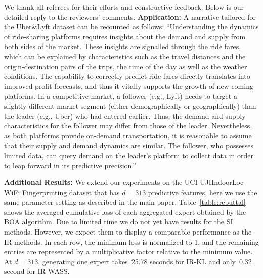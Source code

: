 \documentclass{article}
\begin{document}
\onecolumn

We thank all referees for their efforts and constructive feedback. Below is our detailed reply to the reviewers' comments.
{\bf Application:} A narrative tailored for the Uber\&Lyft dataset can be recounted as follows: 
``Understanding the dynamics of ride-sharing platforms requires insights about the demand and supply from both sides of the market. These insights are signalled through the ride fares, which can be explained by characteristics such as the travel distances and the origin-destination pairs of the trips, the time of the day as well as the weather conditions. The capability to correctly predict ride fares directly translates into improved profit forecasts, and thus it vitally supports the growth of new-coming platforms. In a competitive market, a follower (e.g., Lyft) needs to target a slightly different market segment (either demographically or geographically) than the leader (e.g., Uber) who had entered earlier. Thus, the demand and supply characteristics for the follower may differ from those of the leader. Nevertheless, as both platforms provide on-demand transportation, it is reasonable to assume that their supply and demand dynamics are similar. The follower, who possesses limited data, can query demand on the leader's platform to collect data in order to leap forward in its predictive precision.''
\vspace{-.1cm}

\textbf{Additional Results:} We extend our experiments on the UCI UJIIndoorLoc WiFi Fingerprinting dataset that has $d=313$ predictive features, here we use the same parameter setting as described in the main paper. Table~\ref{table:rebuttal} shows the averaged cumulative loss of each aggregated expert obtained by the BOA algorithm. Due to limited time we do not yet have results for the SI methods. However, we expect them to display a comparable performance as the IR methods. In each row, the minimum loss is normalized to 1, and the remaining entries are represented by a multiplicative factor relative to the minimum value. At $d \!=\! 313$, generating one expert takes~25.78 seconds for IR-KL and only~0.32 second for IR-WASS.  
\vspace{-.1cm}
\end{document}
